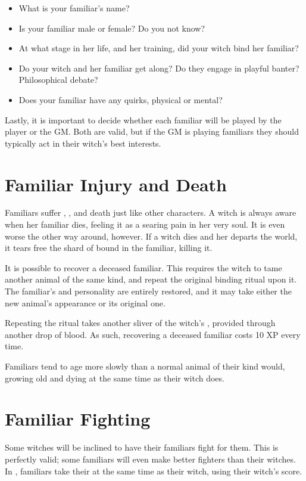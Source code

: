 \begin{itemize}
	\item What is your familiar's name?
	\item Is your familiar male or female?
		Do you not know?
	\item At what stage in her life, and her training, did your witch bind her familiar?
	\item Do your witch and her familiar get along?
		Do they engage in playful banter?
		Philosophical debate?
	\item Does your familiar have any quirks, physical or mental?
\end{itemize}

Lastly, it is important to decide whether each familiar will be played by the player or the GM.
Both are valid, but if the GM is playing familiars they should typically act in their witch's best interests.

\section{Familiar Injury and Death}

Familiars suffer {\damage}, {\shock}, and death just like other characters.
A witch is always aware when her familiar dies, feeling it as a searing pain in her very soul.
It is even worse the other way around, however.
If a witch dies and her {\soul} departs the world, it tears free the shard of {\soul} bound in the familiar, killing it.

It is possible to recover a deceased familiar.
This requires the witch to tame another animal of the same kind, and repeat the original binding ritual upon it.
The familiar's {\soul} and personality are entirely restored, and it may take either the new animal's appearance or its original one.

Repeating the ritual takes another sliver of the witch's {\soul}, provided through another drop of blood.
As such, recovering a deceased familiar costs 10 XP every time.

Familiars tend to age more slowly than a normal animal of their kind would, growing old and dying at the same time as their witch does.

\section{Familiar Fighting}

Some witches will be inclined to have their familiars fight for them.
This is perfectly valid; some familiars will even make better fighters than their witches.
In {\structuredtime}, familiars take their {\turn} at the same time as their witch, using their witch's {\initiative} score.

